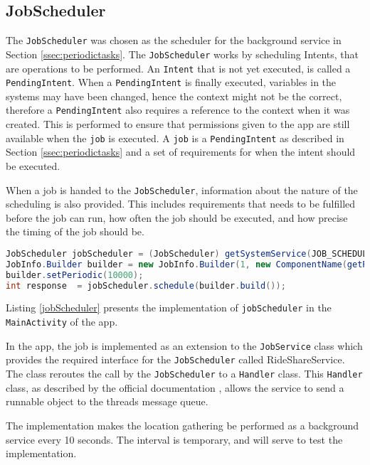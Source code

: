 \subsection{JobScheduler}
The \texttt{JobScheduler} was chosen as the scheduler for the background service in Section \ref{ssec:periodictasks}.
The \texttt{JobScheduler} works by scheduling Intents, that are operations to be performed. %
An \texttt{Intent} that is not yet executed, is called a \texttt{PendingIntent}.
When a \texttt{PendingIntent} is finally executed, variables in the systems may have been changed, hence the context might not be the correct, therefore a \texttt{PendingIntent} also requires a reference to the context when it was created.
This is performed to ensure that permissions given to the app are still available when the \texttt{job} is executed.
A \texttt{job} is a \texttt{PendingIntent} as described in Section \ref{ssec:periodictasks} and a set of requirements for when the intent should be executed.

When a job is handed to the \texttt{JobScheduler}, information about the nature of the scheduling is also provided.
This includes requirements that needs to be fulfilled before the job can run, how often the job should be executed, and how precise the timing of the job should be.


\begin{lstlisting}[language=Java, label=jobScheduler, caption=The implementation of jobScheduler.]
JobScheduler jobScheduler = (JobScheduler) getSystemService(JOB_SCHEDULER_SERVICE);
JobInfo.Builder builder = new JobInfo.Builder(1, new ComponentName(getPackageName(), RideShareService.class.getName()));
builder.setPeriodic(10000);
int response  = jobScheduler.schedule(builder.build());	
\end{lstlisting}

Listing \ref{jobScheduler} presents the implementation of \texttt{jobScheduler} in the \texttt{MainActivity} of the app.

In the app, the job is implemented as an extension to the \texttt{JobService} class which provides the required interface for the \texttt{JobScheduler} called RideShareService.
The class reroutes the call by the \texttt{JobScheduler} to a \texttt{Handler} class.
This \texttt{Handler} class, as described by the official documentation \cite{handler}, allows the service to send a runnable object to the threads message queue.

The implementation makes the location gathering be performed as a background service every 10 seconds.
The interval is temporary, and will serve to test the implementation.


